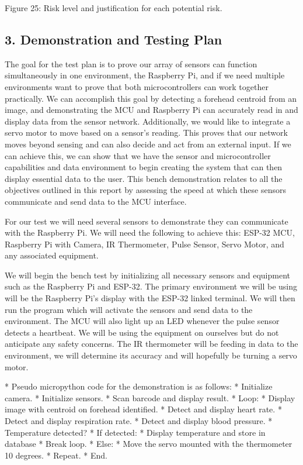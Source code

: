 ﻿\documentclass[10pt]{article}
\begin{document}
Figure 25: Risk level and justification for each potential risk. 
  
\subsection{3. Demonstration and Testing Plan}
The goal for the test plan is to prove our array of sensors can function simultaneously in one environment, the Raspberry Pi, and if we need multiple environments want to prove that both microcontrollers can work together practically. We can accomplish this goal by detecting a forehead centroid from an image, and demonstrating the MCU and Raspberry Pi can accurately read in and display data from the sensor network. Additionally, we would like to integrate a servo motor to move based on a sensor’s reading. This proves that our network moves beyond sensing and can also decide and act from an external input. If we can achieve this, we can show that we have the sensor and microcontroller capabilities and data environment to begin creating the system that can then display essential data to the user. This bench demonstration relates to all the objectives outlined in this report by assessing the speed at which these sensors communicate and send data to the MCU interface. 

For our test we will need several sensors to demonstrate they can communicate with the Raspberry Pi. We will need the following to achieve this: ESP-32 MCU, Raspberry Pi with Camera, IR Thermometer, Pulse Sensor, Servo Motor, and any associated equipment. 

We will begin the bench test by initializing all necessary sensors and equipment such as the Raspberry Pi and ESP-32. The primary environment we will be using will be the Raspberry Pi’s display with the ESP-32 linked terminal. We will then run the program which will activate the sensors and send data to the environment. The MCU will also light up an LED whenever the pulse sensor detects a heartbeat. We will be using the equipment on ourselves but do not anticipate any safety concerns. The IR thermometer will be feeding in data to the environment, we will determine its accuracy and will hopefully be turning a servo motor. 

* Pseudo micropython code for the demonstration is as follows:
   * Initialize camera.
   * Initialize sensors.
   * Scan barcode and display result.
   * Loop:
      * Display image with centroid on forehead identified. 
      * Detect and display heart rate.
      * Detect and display respiration rate.
      * Detect and display blood pressure.
      * Temperature detected?
      * If detected:
         * Display temperature and store in database
         * Break loop.
      * Else:
         * Move the servo mounted with the thermometer 10 degrees.
         * Repeat.
   * End.
\end{document}
